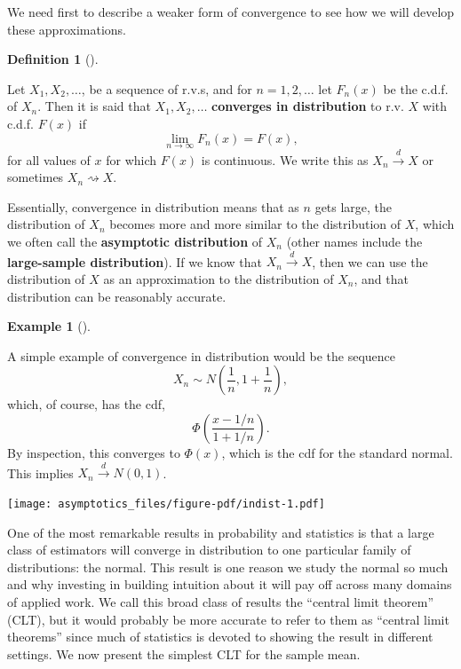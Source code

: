 \documentclass[
  13pt,
  letterpaper,
  DIV=11,
  numbers=noendperiod]{scrreprt}
\newcommand{\indist}{\overset{d}{\to}}
\theoremstyle{definition}
\newtheorem{definition}{Definition}[chapter]
\theoremstyle{definition}
\newtheorem{example}{Example}[chapter]
\theoremstyle{plain}
\theoremstyle{remark}
\begin{document}
We need first to describe a weaker form of convergence to see how we
will develop these approximations.

\begin{definition}[]\protect\hypertarget{def-indist}{}\label{def-indist}

Let \(X_1,X_2,\ldots\), be a sequence of r.v.s, and for
\(n = 1,2, \ldots\) let \(F_n(x)\) be the c.d.f. of \(X_n\). Then it is
said that \(X_1, X_2, \ldots\) \textbf{converges in distribution} to
r.v. \(X\) with c.d.f. \(F(x)\) if \[
\lim_{n\rightarrow \infty} F_n(x) = F(x),
\] for all values of \(x\) for which \(F(x)\) is continuous. We write
this as \(X_n \indist X\) or sometimes \(X_n ⇝ X\).

\end{definition}

Essentially, convergence in distribution means that as \(n\) gets large,
the distribution of \(X_n\) becomes more and more similar to the
distribution of \(X\), which we often call the \textbf{asymptotic
distribution} of \(X_n\) (other names include the \textbf{large-sample
distribution}). If we know that \(X_n \indist X\), then we can use the
distribution of \(X\) as an approximation to the distribution of
\(X_n\), and that distribution can be reasonably accurate.

\begin{example}[]\protect\hypertarget{exm-indist}{}\label{exm-indist}

A simple example of convergence in distribution would be the sequence \[
X_n \sim N\left(\frac{1}{n}, 1 + \frac{1}{n}\right),
\] which, of course, has the cdf, \[
\Phi\left(\frac{x - 1/n}{1+1/n}\right).
\] By inspection, this converges to \(\Phi(x)\), which is the cdf for
the standard normal. This implies \(X_n \indist N(0, 1)\).

\texttt{[image: asymptotics\_files/figure-pdf/indist-1.pdf]}

\end{example}

One of the most remarkable results in probability and statistics is that
a large class of estimators will converge in distribution to one
particular family of distributions: the normal. This result is one
reason we study the normal so much and why investing in building
intuition about it will pay off across many domains of applied work. We
call this broad class of results the ``central limit theorem'' (CLT),
but it would probably be more accurate to refer to them as ``central
limit theorems'' since much of statistics is devoted to showing the
result in different settings. We now present the simplest CLT for the
sample mean.
\end{document}
